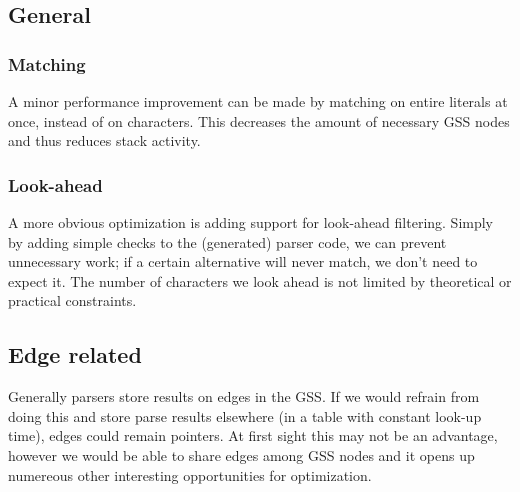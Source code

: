 \documentclass[a4paper,10pt]{article}
\begin{document}
\subsection{General}

\subsubsection{Matching}
A minor performance improvement can be made by matching on entire literals at once, instead of on characters. This decreases the amount of necessary GSS nodes and thus reduces stack activity.

\subsubsection{Look-ahead}
A more obvious optimization is adding support for look-ahead filtering. Simply by adding simple checks to the (generated) parser code, we can prevent unnecessary work; if a certain alternative will never match, we don't need to expect it. The number of characters we look ahead is not limited by theoretical or practical constraints.

\subsection{Edge related}

Generally parsers store results on edges in the GSS. If we would refrain from doing this and store parse results elsewhere (in a table with constant look-up time), edges could remain pointers. At first sight this may not be an advantage, however we would be able to share edges among GSS nodes and it opens up numereous other interesting opportunities for optimization.
\end{document}
